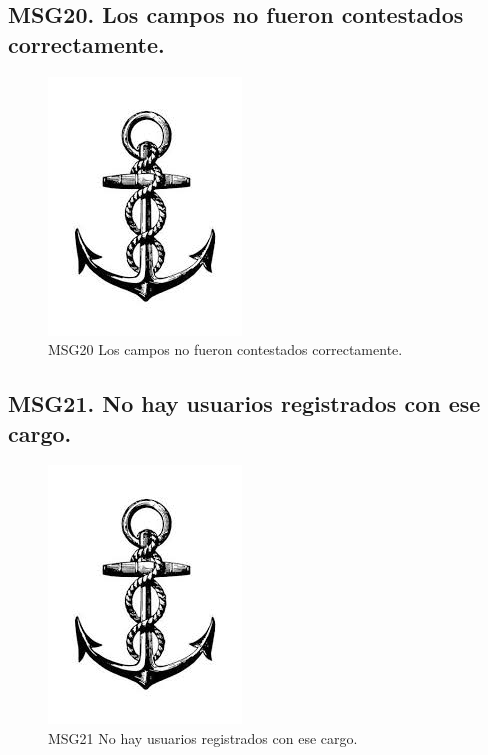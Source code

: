 \subsection{MSG20. Los campos no fueron contestados correctamente.}
    \begin{figure}[htbp]
        \begin{center}
            \includegraphics[width=.4\textwidth]{images/MSG/ancla}
            \caption{MSG20 Los campos no fueron contestados correctamente.}
            \label{fig:MSG20}
        \end{center}
    \end{figure}

\subsection{MSG21. No hay usuarios registrados con ese cargo.}
    \begin{figure}[htbp]
        \begin{center}
            \includegraphics[width=.4\textwidth]{images/MSG/ancla}
            \caption{MSG21 No hay usuarios registrados con ese cargo.}
            \label{fig:MSG21}
        \end{center}
    \end{figure}


